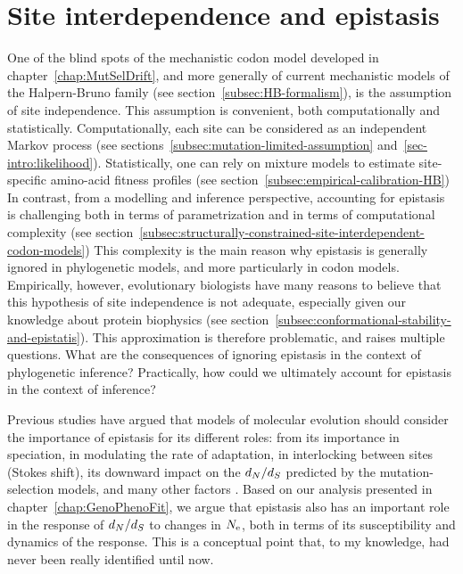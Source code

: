 \section{Site interdependence and epistasis}
\label{sec:epistasis-and-entrenchment}

One of the blind spots of the mechanistic \gls{codon} model developed in chapter~\ref{chap:MutSelDrift}, and more generally of current mechanistic models of the Halpern-Bruno family (see section~\ref{subsec:HB-formalism}), is the assumption of site independence.
This assumption is convenient, both computationally and statistically.
Computationally, each site can be considered as an independent Markov process (see sections~\ref{subsec:mutation-limited-assumption} and~\ref{sec-intro:likelihood}).
Statistically, one can rely on mixture models to estimate site-specific amino-acid fitness profiles (see section~\ref{subsec:empirical-calibration-HB})
In contrast, from a modelling and inference perspective, accounting for epistasis is challenging both in terms of parametrization and in terms of computational complexity (see section~\ref{subsec:structurally-constrained-site-interdependent-codon-models})
This complexity is the main reason why epistasis is generally ignored in phylogenetic models, and more particularly in \gls{codon} models.
Empirically, however, evolutionary biologists have many reasons to believe that this hypothesis of site independence is not adequate, especially given our knowledge about protein biophysics (see section~\ref{subsec:conformational-stability-and-epistatis}).
This approximation is therefore problematic, and raises multiple questions.
What are the consequences of ignoring epistasis in the context of phylogenetic inference?
Practically, how could we ultimately account for epistasis in the context of inference?

Previous studies have argued that models of molecular evolution should consider the importance of epistasis for its different roles: from its importance in speciation, in modulating the rate of adaptation, in interlocking between sites (Stokes shift), its downward impact on the $d_N / d_S$ predicted by the mutation-selection models, and many other factors \citet{Goldstein2017, Miller2018}.
Based on our analysis presented in chapter~\ref{chap:GenoPhenoFit}, we argue that epistasis also has an important role in the response of $d_N / d_S$ to changes in $N_{\text{e}}$, both in terms of its susceptibility and dynamics of the response.
This is a conceptual point that, to my knowledge, had never been really identified until now.

